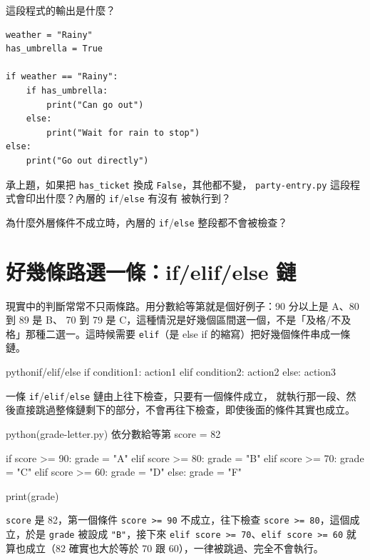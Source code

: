 \begin{drills}[label=drills:nested-if]
\item 這段程式的輸出是什麼？
\begin{verbatim}
weather = "Rainy"
has_umbrella = True

if weather == "Rainy":
    if has_umbrella:
        print("Can go out")
    else:
        print("Wait for rain to stop")
else:
    print("Go out directly")
\end{verbatim}
\item 承上題，如果把 \texttt{has\_ticket} 換成 \texttt{False}，其他都不變，
\texttt{party-entry.py} 這段程式會印出什麼？內層的 \texttt{if}/\texttt{else} 有沒有
被執行到？
\item 為什麼外層條件不成立時，內層的 \texttt{if}/\texttt{else} 整段都不會被檢查？
\end{drills}

\section{好幾條路選一條：if/elif/else 鏈}
\label{sec:elif-chain}

現實中的判斷常常不只兩條路。用分數給等第就是個好例子：90 分以上是 A、80 到 89 是 B、
70 到 79 是 C，這種情況是好幾個區間選一個，不是「及格/不及格」那種二選一。這時候需要
\texttt{elif}（是 else if 的縮寫）把好幾個條件串成一條鏈。

\begin{code}{python}{if/elif/else}
if condition1:
    action1
elif condition2:
    action2
else:
    action3
\end{code}

一條 \texttt{if}/\texttt{elif}/\texttt{else} 鏈由上往下檢查，只要有一個條件成立，
就執行那一段、然後直接跳過整條鏈剩下的部分，不會再往下檢查，即使後面的條件其實也成立。

\begin{example}{python}{(grade-letter.py) 依分數給等第}
score = 82

if score >= 90:
    grade = "A"
elif score >= 80:
    grade = "B"
elif score >= 70:
    grade = "C"
elif score >= 60:
    grade = "D"
else:
    grade = "F"

print(grade)
\end{example}


\texttt{score} 是 82，第一個條件 \texttt{score >= 90} 不成立，往下檢查
\texttt{score >= 80}，這個成立，於是 \texttt{grade} 被設成 \texttt{"B"}，接下來
\texttt{elif score >= 70}、\texttt{elif score >= 60} 就算也成立（82 確實也大於等於
70 跟 60），一律被跳過、完全不會執行。

